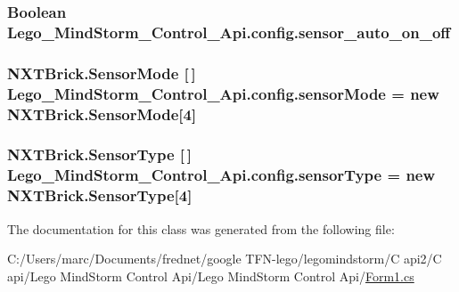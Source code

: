\hypertarget{class_lego___mind_storm___control___api_1_1config_b70d0fce3ca76b31bcbe0c253db5f0bb}{
\subsubsection[{sensor\_\-auto\_\-on\_\-off}]{\setlength{\rightskip}{0pt plus 5cm}Boolean {\bf Lego\_\-MindStorm\_\-Control\_\-Api.config.sensor\_\-auto\_\-on\_\-off}}}
\label{class_lego___mind_storm___control___api_1_1config_b70d0fce3ca76b31bcbe0c253db5f0bb}


\hypertarget{class_lego___mind_storm___control___api_1_1config_7549849a8de7eab30f658950819e6535}{
\subsubsection[{sensorMode}]{\setlength{\rightskip}{0pt plus 5cm}NXTBrick.SensorMode \mbox{[}$\,$\mbox{]} {\bf Lego\_\-MindStorm\_\-Control\_\-Api.config.sensorMode} = new NXTBrick.SensorMode\mbox{[}4\mbox{]}}}
\label{class_lego___mind_storm___control___api_1_1config_7549849a8de7eab30f658950819e6535}


\hypertarget{class_lego___mind_storm___control___api_1_1config_66977ca07b5d4efab19da1e89ee8a51c}{
\subsubsection[{sensorType}]{\setlength{\rightskip}{0pt plus 5cm}NXTBrick.SensorType \mbox{[}$\,$\mbox{]} {\bf Lego\_\-MindStorm\_\-Control\_\-Api.config.sensorType} = new NXTBrick.SensorType\mbox{[}4\mbox{]}}}
\label{class_lego___mind_storm___control___api_1_1config_66977ca07b5d4efab19da1e89ee8a51c}




The documentation for this class was generated from the following file:\begin{CompactItemize}
\item 
C:/Users/marc/Documents/frednet/google TFN-lego/legomindstorm/C api2/C api/Lego MindStorm Control Api/Lego MindStorm Control Api/\hyperlink{_form1_8cs}{Form1.cs}\end{CompactItemize}
